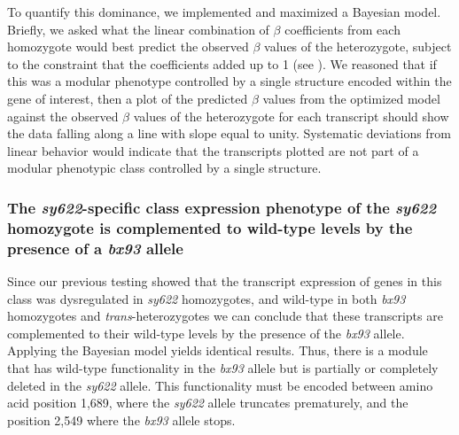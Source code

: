 \documentclass[10pt, twocolumn]{article}
\begin{document}
To quantify this dominance, we implemented and maximized a Bayesian model.
Briefly, we asked what the linear combination of $\beta$ coefficients from each
homozygote would best predict the observed $\beta$ values of the heterozygote,
subject to the constraint that the coefficients added up to 1 (see
). We reasoned that if this was a modular phenotype
controlled by a single structure encoded within the gene of interest, then a
plot of the predicted $\beta$ values from the optimized model against the
observed $\beta$ values of the heterozygote for each transcript should show the
data falling along a line with slope equal to unity. Systematic deviations from
linear behavior would indicate that the transcripts plotted are not part of a
modular phenotypic class controlled by a single structure.

\subsubsection*{The \emph{sy622}-specific class expression phenotype of the
                \emph{sy622} homozygote is complemented to wild-type levels by
                the presence of a \emph{bx93} allele}
Since our previous testing showed that the transcript expression of genes in
this class was dysregulated in \emph{sy622} homozygotes, and wild-type in both
\emph{bx93} homozygotes and \emph{trans}-heterozygotes we can conclude that
these transcripts are complemented to their wild-type levels by the presence of
the \emph{bx93} allele. Applying the Bayesian model yields identical results.
Thus, there is a module that has wild-type functionality in the \emph{bx93}
allele but is partially or completely deleted in the \emph{sy622} allele. This
functionality must be encoded between amino acid position 1,689, where the
\emph{sy622} allele truncates prematurely, and the position 2,549 where the
\emph{bx93} allele stops.
\end{document}
